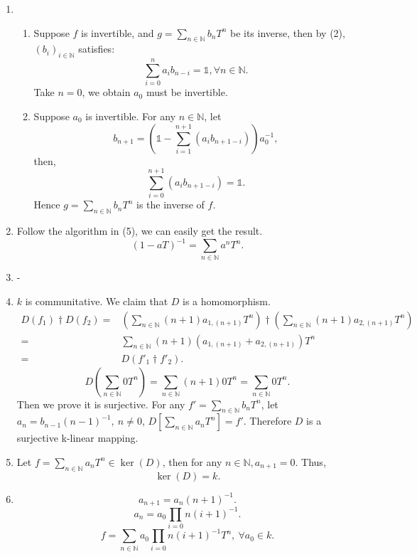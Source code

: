 \documentclass[12pt]{article}
\newcommand{\NN}{\mathbb{N}}
\begin{document}
\begin{enumerate}
\begin{enumerate}
            \item 
                \begin{enumerate}
                    \item Suppose $f$ is invertible, and $\displaystyle g=\sum_{n\in \NN}b_nT^n$ be its inverse, then by (2), $(b_i)_{i\in \NN}$ satisfies:
                        $$\sum_{i=0}^{n}a_ib_{n-i}=\mathds{1},\forall n\in \NN.$$
                        Take $n=0$, we obtain $a_0$ must be invertible.
                    \item Suppose $a_0$ is invertible. For any $n\in \NN$, let 
                        $$b_{n+1}=\left(\mathds{1}-\sum_{i=1}^{n+1}(a_ib_{n+1-i})\right)a_0^{-1},$$
                        then,
                        $$\sum_{i=0}^{n+1}(a_ib_{n+1-i})=\mathds{1}.$$
                        Hence $\displaystyle g=\sum_{n\in \NN}b_nT^n$ is the inverse of $f$.
                \end{enumerate}
                \item Follow the algorithm in (5), we can easily get the result.
                    $$(1-aT)^{-1}=\sum_{n\in \NN}a^nT^n.$$
                \item -
                \item $k$ is communitative. We claim that $D$ is a homomorphism. 
                    \begin{align*}
                        D(f_1)\dagger D(f_2)=&\left(\sum_{n\in \NN}(n+1)a_{1,(n+1)}T^n\right)\dagger \left(\sum_{n\in \NN}(n+1)a_{2,(n+1)}T^n\right)\\
                        =&\sum_{n\in \NN}(n+1)(a_{1,(n+1)}+ a_{2,(n+1)})T^n\\
                        =&D\left(f'_1\dagger f'_2\right).
                    \end{align*}
                    $$
                        D\left(\sum_{n\in\NN}0T^n\right)=\sum_{n\in \NN}(n+1)0T^n=\sum_{n\in \NN}0T^n.
                    $$
                    Then we prove it is surjective. For any $f'=\sum_{n\in \NN}b_nT^n$, let $a_n=b_{n-1}(n-1)^{-1},\ n\not=0$, $D[\sum_{n\in\NN}a_nT^n]=f'$. Therefore $D$ is a surjective k-linear mapping.
                \item Let $\displaystyle f=\sum_{n\in \NN}a_nT^n\in \ker(D)$, then for any $n\in\NN,a_{n+1}=0.$ Thus, 
                    $$\ker(D)=k.$$
                \item $$a_{n+1}=a_n(n+1)^{-1}.$$
                    $$a_n=a_0\prod_{i=0}{n}(i+1)^{-1}.$$
                    $$f=\sum_{n\in\NN}a_0\prod_{i=0}{n}(i+1)^{-1}T^n,\ \forall a_0\in k.$$

\end{enumerate}
\end{enumerate}
\end{document}
